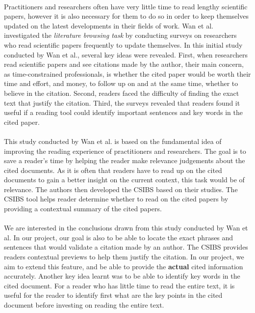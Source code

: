 \documentclass[12 pt]{article}
\begin{document}
\paragraph{}
Practitioners and researchers often have very little time to read lengthy scientific papers, however it is also necessary for them to do so in order to keep themselves updated on the latest developments in their fields of work. Wan et al.\cite{citation-sensitive} investigated the \textit{literature browsing task} by conducting surveys on researchers who read scientific papers frequently to update themselves. In this initial study conducted by Wan et al., several key ideas were revealed. First, when researchers read scientific papers and see citations made by the author, their main concern, as time-constrained professionals, is whether the cited paper would be worth their time and effort, and money, to follow up on and at the same time, whether to believe in the citation. Second, readers faced the difficulty of finding the exact text that justify the citation. Third, the surveys revealed that readers found it useful if a reading tool could identify important sentences and key words in the cited paper.

\paragraph{}
This study conducted by Wan et al. is based on the fundamental idea of improving the reading experience of practitioners and researchers. The goal is to save a reader's time by helping the reader make relevance judgements about the cited documents. As it is often that readers have to read up on the cited documents to gain a better insight on the current context, this task would be of relevance. The authors then developed the CSIBS\cite{csibs} based on their studies. The CSIBS tool helps reader determine whether to read on the cited papers by providing a contextual summary of the cited papers.

\paragraph{}
We are interested in the conclusions drawn from this study conducted by Wan et al. In our project, our goal is also to be able to locate the exact phrases and sentences that would validate a citation made by an author. The CSIBS provides readers contextual previews to help them justify the citation. In our project, we aim to extend this feature, and be able to provide the \textbf{actual} cited information accurately. Another key idea learnt was to be able to identify key words in the cited document. For a reader who has little time to read the entire text, it is useful for the reader to identify first what are the key points in the cited document before investing on reading the entire text.
\end{document}
